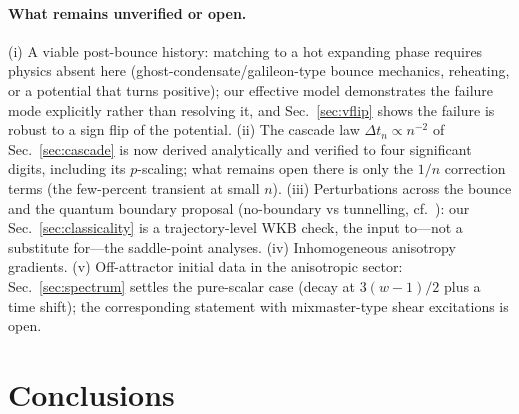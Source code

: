 \documentclass[11pt,a4paper]{article}
\begin{document}
\paragraph{What remains unverified or open.}
(i) A viable post-bounce history: matching to a hot expanding phase
requires physics absent here (ghost-condensate/galileon-type bounce
mechanics, reheating, or a potential that turns positive); our effective
model demonstrates the failure mode explicitly rather than resolving it,
and Sec.~\ref{sec:vflip} shows the failure is robust to a sign flip of the
potential. (ii) The cascade law $\Delta t_n\propto n^{-2}$ of
Sec.~\ref{sec:cascade} is now derived analytically and verified to four
significant digits, including its $p$-scaling; what remains open there is
only the $1/n$ correction terms (the few-percent transient at small $n$). (iii) Perturbations across the bounce and the quantum
boundary proposal (no-boundary vs tunnelling, cf.\
\cite{BattarraLehners:2014,Feldbrugge:2017}): our
Sec.~\ref{sec:classicality} is a trajectory-level WKB check, the input
to---not a substitute for---the saddle-point analyses.
(iv) Inhomogeneous anisotropy gradients. (v) Off-attractor initial data in
the anisotropic sector: Sec.~\ref{sec:spectrum} settles the pure-scalar
case (decay at $3(w-1)/2$ plus a time shift); the corresponding statement
with mixmaster-type shear excitations is open.

\section{Conclusions}
\end{document}
